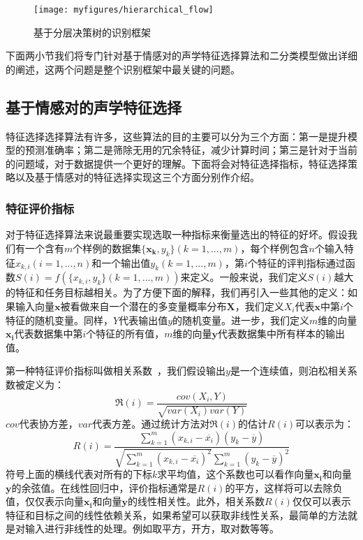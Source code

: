 \begin{figure}[htb] %
    \centering
    \texttt{[image: myfigures/hierarchical\_flow]}
    \caption{基于分层决策树的识别框架}
    \label{fig:hierarchical_flow}
\end{figure}

下面两小节我们将专门针对基于情感对的声学特征选择算法和二分类模型做出详细的阐述，这两个问题是整个识别框架中最关键的问题。

\subsection{基于情感对的声学特征选择}
\label{ssec:emo_pair_feature_select}
特征选择选择算法有许多，这些算法的目的主要可以分为三个方面：第一是提升模型的预测准确率；第二是筛除无用的冗余特征，减少计算时间；第三是针对于当前的问题域，对于数据提供一个更好的理解。下面将会对特征选择指标，特征选择策略以及基于情感对的特征选择实现这三个方面分别作介绍。

\subsubsection{特征评价指标}
\label{sssec:feature_select_metrics}
对于特征选择算法来说最重要实现选取一种指标来衡量选出的特征的好坏。假设我们有一个含有$m$个样例的数据集$\{\mathbf{x_k}, y_k\}(k=1,...,m)$，每个样例包含$n$个输入特征$x_{k,i}(i=1,...,n)$和一个输出值$y_k(k=1,...,m)$，第$i$个特征的评判指标通过函数$S(i)=f(\{x_{k,i}, y_k\}(k=1,...,m))$来定义。一般来说，我们定义$S(i)$越大的特征和任务目标越相关。为了方便下面的解释，我们再引入一些其他的定义：如果输入向量$\mathbf{x}$被看做来自一个潜在的多变量概率分布$\mathbf{X}$，我们定义$X_i$代表$\mathbf{x}$中第$i$个特征的随机变量。同样，$Y$代表输出值$y$的随机变量。进一步，我们定义$m$维的向量$\mathbf{x_i}$代表数据集中第$i$个特征的所有值，$m$维的向量$\mathbf{y}$代表数据集中所有样本的输出值。

第一种特征评价指标叫做相关系数~\cite{Weston2003Use}，我们假设输出$y$是一个连续值，则泊松相关系数被定义为：
\begin{equation}
\label{equ:pearson_cc}
    \Re(i) = \frac{cov(X_i, Y)}{\sqrt{var(X_i)var(Y)}}
\end{equation}
$cov$代表协方差，$var$代表方差。通过统计方法对$\Re(i)$的估计$R(i)$可以表示为：
\begin{equation}
\label{equ:pearson_cc_real}
    R(i) = \frac{\sum_{k=1}^{m}(x_{k,i} - \overline{x_i})(y_k - \overline{y})}{\sqrt{\sum_{k=1}^{m}(x_{k,i} - \overline{x_i})^2}\sum_{k=1}^{m}(y_k - \overline{y})^2}
\end{equation}
符号上面的横线代表对所有的下标$k$求平均值，这个系数也可以看作向量$\mathbf{x_i}$和向量$\mathbf{y}$的余弦值。在线性回归中，评价指标通常是$R(i)$的平方，这样将可以去除负值，仅仅表示向量$\mathbf{x_i}$和向量$\mathbf{y}$的线性相关性。此外，相关系数$R(i)$仅仅可以表示特征和目标之间的线性依赖关系，如果希望可以获取非线性关系，最简单的方法就是对输入进行非线性的处理。例如取平方，开方，取对数等等。

